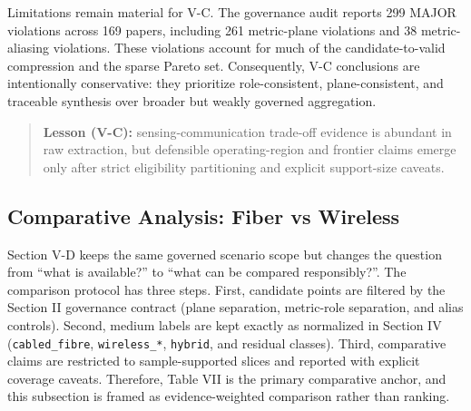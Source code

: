 Limitations remain material for V-C. The governance audit reports 299 MAJOR violations across 169 papers, including 261 metric-plane violations and 38 metric-aliasing violations. These violations account for much of the candidate-to-valid compression and the sparse Pareto set. Consequently, V-C conclusions are intentionally conservative: they prioritize role-consistent, plane-consistent, and traceable synthesis over broader but weakly governed aggregation.

\begin{quote}
\textbf{Lesson (V-C):} sensing-communication trade-off evidence is abundant in raw extraction, but defensible operating-region and frontier claims emerge only after strict eligibility partitioning and explicit support-size caveats.
\end{quote}

\subsection{Comparative Analysis: Fiber vs Wireless}
Section V-D keeps the same governed scenario scope but changes the question from ``what is available?'' to ``what can be compared responsibly?''. The comparison protocol has three steps. First, candidate points are filtered by the Section II governance contract (plane separation, metric-role separation, and alias controls). Second, medium labels are kept exactly as normalized in Section IV (\texttt{cabled\_fibre}, \texttt{wireless\_*}, \texttt{hybrid}, and residual classes). Third, comparative claims are restricted to sample-supported slices and reported with explicit coverage caveats. Therefore, Table VII is the primary comparative anchor, and this subsection is framed as evidence-weighted comparison rather than ranking.

